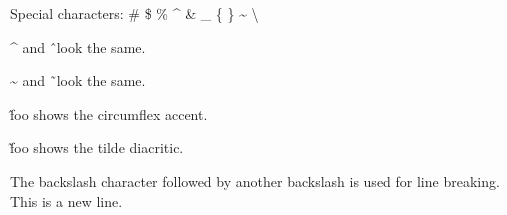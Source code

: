 \documentclass{article}
\begin{document}
Special characters:
\# \$ \% \^{} \& \_ \{ \} \~{} \textbackslash

\^{} and \^\ look the same.

\~{} and \~\ look the same.

\^foo shows the circumflex accent.

\~foo shows the tilde diacritic.

The backslash character followed by another backslash is used for line
breaking.\\
This is a new line.
\end{document}
